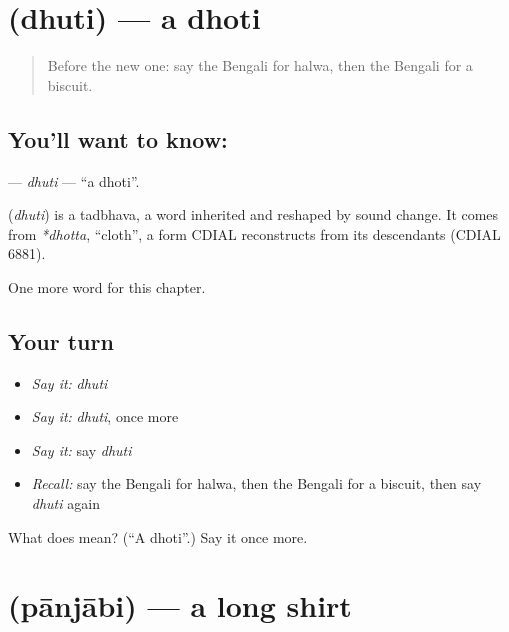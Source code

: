 \section[\texorpdfstring{\bn{ধুতি} (dhuti)}{ধুতি (dhuti)}]{ (dhuti) — a dhoti}

\label{lesson:BN-C119-dhuti}



\begin{quote}
Before the new one: say the Bengali for halwa, then the Bengali for a biscuit.
\end{quote}

\subsection*{You'll want to know: }
\textbf{} — \emph{dhuti} — \textquotedblleft{}a dhoti\textquotedblright{}.

\begin{cousinweb}
\textbf{} (\emph{dhuti}) is a tadbhava, a word inherited and reshaped by sound change. It comes from \emph{*dhotta}, \textquotedblleft{}cloth\textquotedblright{}, a form CDIAL reconstructs from its descendants (CDIAL 6881).
\end{cousinweb}

\begin{grammarlens}[title={What you've built}]
One more word for this chapter.
\end{grammarlens}

\subsection*{Your turn}
\begin{itemize}
\raggedright
  \item \emph{Say it:} \emph{dhuti}
  \item \emph{Say it:} \emph{dhuti}, once more
  \item \emph{Say it:} say \emph{dhuti}
  \item \emph{Recall:} say the Bengali for halwa, then the Bengali for a biscuit, then say \emph{dhuti} again
\end{itemize}

\begin{tcolorbox}[breakable,colback=teal!4,colframe=teal!35!black,title={Before you move on}]
What does  mean? (\textquotedblleft{}A dhoti\textquotedblright{}.) Say it once more.
\end{tcolorbox}
\section[\texorpdfstring{\bn{পাঞ্জাবি} (pānjābi)}{পাঞ্জাবি (pānjābi)}]{ (pānjābi) — a long shirt}

